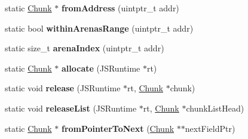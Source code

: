 \begin{DoxyCompactItemize}
\item 
\hypertarget{structjs_1_1gc_1_1_chunk_a4feaf1509d2f52caaac028ee58a7fecd}{static \hyperlink{structjs_1_1gc_1_1_chunk}{Chunk} $\ast$ {\bfseries from\-Address} (uintptr\-\_\-t addr)}\label{structjs_1_1gc_1_1_chunk_a4feaf1509d2f52caaac028ee58a7fecd}

\item 
\hypertarget{structjs_1_1gc_1_1_chunk_a69ffed0e7d35ebe3006293a5424ba99c}{static bool {\bfseries within\-Arenas\-Range} (uintptr\-\_\-t addr)}\label{structjs_1_1gc_1_1_chunk_a69ffed0e7d35ebe3006293a5424ba99c}

\item 
\hypertarget{structjs_1_1gc_1_1_chunk_aafb38bcab1f8fc258ecb75d235c47b6d}{static size\-\_\-t {\bfseries arena\-Index} (uintptr\-\_\-t addr)}\label{structjs_1_1gc_1_1_chunk_aafb38bcab1f8fc258ecb75d235c47b6d}

\item 
\hypertarget{structjs_1_1gc_1_1_chunk_a1c50b9adce68d1835ffe8d6b28306428}{static \hyperlink{structjs_1_1gc_1_1_chunk}{Chunk} $\ast$ {\bfseries allocate} (J\-S\-Runtime $\ast$rt)}\label{structjs_1_1gc_1_1_chunk_a1c50b9adce68d1835ffe8d6b28306428}

\item 
\hypertarget{structjs_1_1gc_1_1_chunk_a4f1fba2a1ea3343d5e4b4e3033624d3e}{static void {\bfseries release} (J\-S\-Runtime $\ast$rt, \hyperlink{structjs_1_1gc_1_1_chunk}{Chunk} $\ast$chunk)}\label{structjs_1_1gc_1_1_chunk_a4f1fba2a1ea3343d5e4b4e3033624d3e}

\item 
\hypertarget{structjs_1_1gc_1_1_chunk_aad71e5f32774f7e875995e7e0e8b2396}{static void {\bfseries release\-List} (J\-S\-Runtime $\ast$rt, \hyperlink{structjs_1_1gc_1_1_chunk}{Chunk} $\ast$chunk\-List\-Head)}\label{structjs_1_1gc_1_1_chunk_aad71e5f32774f7e875995e7e0e8b2396}

\item 
\hypertarget{structjs_1_1gc_1_1_chunk_a062da78b4c5f8b19c58f0071c33411ec}{static \hyperlink{structjs_1_1gc_1_1_chunk}{Chunk} $\ast$ {\bfseries from\-Pointer\-To\-Next} (\hyperlink{structjs_1_1gc_1_1_chunk}{Chunk} $\ast$$\ast$next\-Field\-Ptr)}\label{structjs_1_1gc_1_1_chunk_a062da78b4c5f8b19c58f0071c33411ec}

\end{DoxyCompactItemize}
